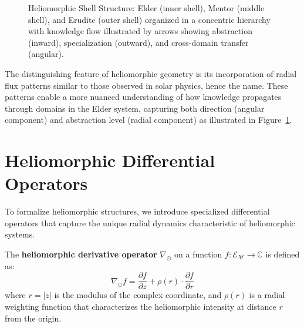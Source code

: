 \begin{figure}[h]
\caption{Heliomorphic Shell Structure: Elder (inner shell), Mentor (middle shell), and Erudite (outer shell) organized in a concentric hierarchy with knowledge flow illustrated by arrows showing abstraction (inward), specialization (outward), and cross-domain transfer (angular).}
\label{fig:heliomorphic_shells}
\end{figure}

The distinguishing feature of heliomorphic geometry is its incorporation of radial flux patterns similar to those observed in solar physics, hence the name. These patterns enable a more nuanced understanding of how knowledge propagates through domains in the Elder system, capturing both direction (angular component) and abstraction level (radial component) as illustrated in Figure~\ref{fig:heliomorphic_shells}.

\section{Heliomorphic Differential Operators}

To formalize heliomorphic structures, we introduce specialized differential operators that capture the unique radial dynamics characteristic of heliomorphic systems.

\begin{definition}
The \textbf{heliomorphic derivative operator} $\nabla_{\odot}$ on a function $f: \mathcal{E}_{\mathcal{M}} \rightarrow \mathbb{C}$ is defined as:
\begin{equation}
\nabla_{\odot} f = \frac{\partial f}{\partial z} + \rho(r) \cdot \frac{\partial f}{\partial r}
\end{equation}
where $r = |z|$ is the modulus of the complex coordinate, and $\rho(r)$ is a radial weighting function that characterizes the heliomorphic intensity at distance $r$ from the origin.
\end{definition}

